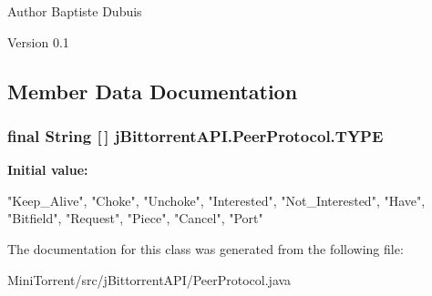 \begin{DoxyAuthor}{Author}
Baptiste Dubuis 
\end{DoxyAuthor}
\begin{DoxyVersion}{Version}
0.1 
\end{DoxyVersion}


\subsection{Member Data Documentation}
\hypertarget{classj_bittorrent_a_p_i_1_1_peer_protocol_ac0f508c7fb75a6cb28e9ed045eef5430}{
\subsubsection[{TYPE}]{\setlength{\rightskip}{0pt plus 5cm}final String \mbox{[}$\,$\mbox{]} jBittorrentAPI.PeerProtocol.TYPE}}
\label{classj_bittorrent_a_p_i_1_1_peer_protocol_ac0f508c7fb75a6cb28e9ed045eef5430}
{\bfseries Initial value:}
\begin{DoxyCode}
 {"Keep_Alive", "Choke", "Unchoke",
                                        "Interested", "Not_Interested", "Have",
                                        "Bitfield", "Request", "Piece",
                                        "Cancel", "Port"}
\end{DoxyCode}


The documentation for this class was generated from the following file:\begin{DoxyCompactItemize}
\item 
MiniTorrent/src/jBittorrentAPI/PeerProtocol.java\end{DoxyCompactItemize}
